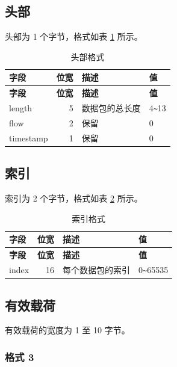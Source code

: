 \documentclass[main\_\_CN.tex]{subfiles}
\begin{document}
\subsection{头部}

头部为 1 个字节，格式如表 \ref{tab:header} 所示。


\begin{longtable}[c]{ |l|r|l|l| }
    \caption{头部格式}
    \label{tab:header}
    \\\hline\rowcolor{lightgray}
    \textbf{字段} & \textbf{位宽} & \textbf{描述} & \textbf{值}\\\hline
    \endfirsthead
    \hline\rowcolor{lightgray}
    \textbf{字段} & \textbf{位宽} & \textbf{描述} & \textbf{值}\\\hline
    \endhead
    \endfoot
    \endlastfoot

    length & 5 & 数据包的总长度 & 4\verb+~+13 \\\hline
    flow & 2 & 保留 & 0 \\\hline
    timestamp & 1 & 保留 & 0 \\\hline
 \end{longtable}


\subsection{索引}

索引为 2 个字节，格式如表 \ref{tab:index} 所示。

\begin{longtable}[c]{ |l|r|l|l| }
    \caption{索引格式}
    \label{tab:index}
    \\\hline\rowcolor{lightgray}
    \textbf{字段} & \textbf{位宽} & \textbf{描述} & \textbf{值}\\\hline
    \endfirsthead
    \textbf{字段} & \textbf{位宽} & \textbf{描述} & \textbf{值}\\\hline
    \endhead
    \endfoot
    \endlastfoot

    index & 16 & 每个数据包的索引 & 0\verb+~+65535 \\\hline
 \end{longtable}

\subsection{有效载荷}

有效载荷的宽度为 1 至 10 字节。

\subsubsection{格式 3}
\end{document}

